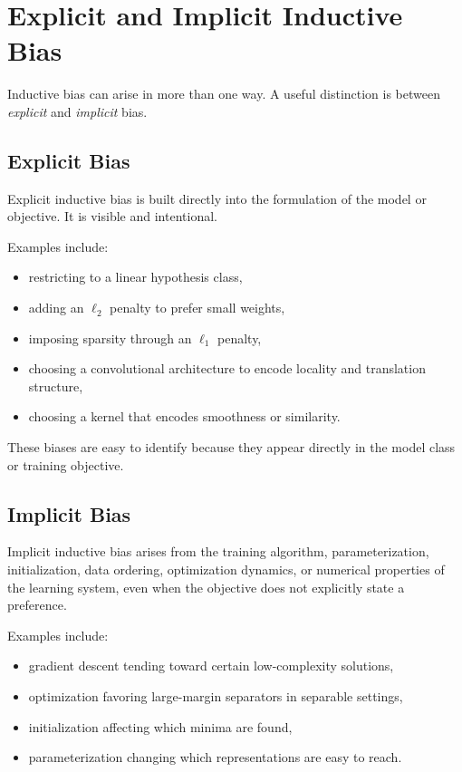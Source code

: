 \section{Explicit and Implicit Inductive Bias}

Inductive bias can arise in more than one way. A useful distinction is between \emph{explicit} and \emph{implicit} bias.

\subsection{Explicit Bias}

Explicit inductive bias is built directly into the formulation of the model or objective. It is visible and intentional.

Examples include:
\begin{itemize}
    \item restricting to a linear hypothesis class,
    \item adding an $\ell_2$ penalty to prefer small weights,
    \item imposing sparsity through an $\ell_1$ penalty,
    \item choosing a convolutional architecture to encode locality and translation structure,
    \item choosing a kernel that encodes smoothness or similarity.
\end{itemize}

These biases are easy to identify because they appear directly in the model class or training objective.

\subsection{Implicit Bias}

Implicit inductive bias arises from the training algorithm, parameterization, initialization, data ordering, optimization dynamics, or numerical properties of the learning system, even when the objective does not explicitly state a preference.

Examples include:
\begin{itemize}
    \item gradient descent tending toward certain low-complexity solutions,
    \item optimization favoring large-margin separators in separable settings,
    \item initialization affecting which minima are found,
    \item parameterization changing which representations are easy to reach.
\end{itemize}

